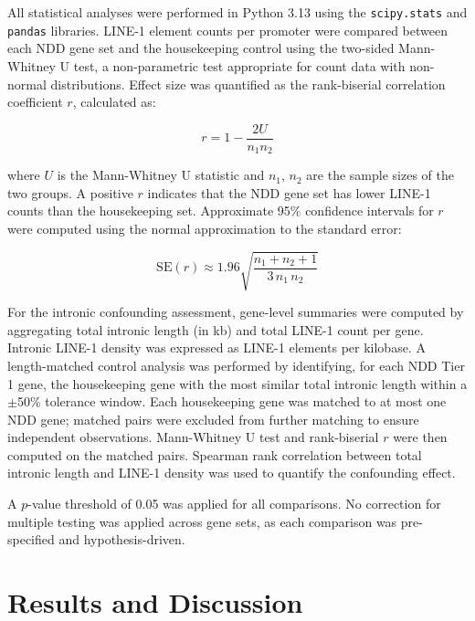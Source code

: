 \documentclass[preprints,briefreport,submit,pdftex,oneauthor]{Definitions/mdpi}
\begin{document}
All statistical analyses were performed in Python 3.13 using
the \texttt{scipy.stats} and \texttt{pandas} libraries.
LINE-1 element counts per promoter were compared between
each NDD gene set and the housekeeping control using the
two-sided Mann-Whitney U test, a non-parametric test
appropriate for count data with non-normal distributions.
Effect size was quantified as the rank-biserial correlation
coefficient $r$, calculated as:

\begin{equation}
r = 1 - \frac{2U}{n_1 n_2}
\end{equation}

\noindent where $U$ is the Mann-Whitney U statistic and $n_1$,
$n_2$ are the sample sizes of the two groups. A positive $r$
indicates that the NDD gene set has lower LINE-1 counts than
the housekeeping set. Approximate 95\% confidence intervals for $r$ were computed
using the normal approximation to the standard error:

\begin{equation}
\mathrm{SE}(r) \approx 1.96 \sqrt{\frac{n_1 + n_2 + 1}{3\,n_1\,n_2}}
\end{equation}

For the intronic confounding assessment, gene-level summaries
were computed by aggregating total intronic length (in kb) and
total LINE-1 count per gene. Intronic LINE-1 density was
expressed as LINE-1 elements per kilobase. A length-matched
control analysis was performed by identifying, for each NDD Tier
1 gene, the housekeeping gene with the most similar total
intronic length within a $\pm$50\% tolerance window. Each housekeeping gene was matched to at most one NDD gene; matched pairs were excluded from further matching to ensure independent observations. Mann-Whitney U test and rank-biserial
$r$ were then computed on the matched pairs. Spearman rank
correlation between total intronic length and LINE-1 density
was used to quantify the confounding effect.

A $p$-value threshold of 0.05 was applied for all comparisons.
No correction for multiple testing was applied across gene
sets, as each comparison was pre-specified and hypothesis-driven.

\section{Results and Discussion}
\end{document}

